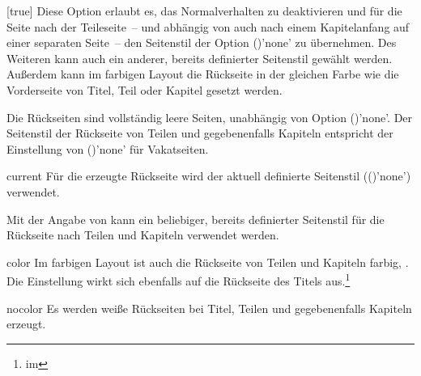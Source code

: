 \begin{Declaration*}{}
\begin{Declaration*}{}
\begin{Declaration*}{}
\begin{Declaration}{}[true]
Diese Option erlaubt es, das Normalverhalten zu deaktivieren und für die Seite 
nach der Teileseite~-- und abhängig von  auch nach einem 
Kapitelanfang auf einer separaten Seite~-- den Seitenstil der Option 
()'none' zu übernehmen. Des 
Weiteren kann auch ein anderer, bereits definierter Seitenstil gewählt werden. 
Außerdem kann im farbigen Layout die Rückseite in der gleichen Farbe wie die 
Vorderseite von Titel, Teil oder Kapitel gesetzt werden. 
\notudscrartcl
%
\begin{values}{}
\itemfalse
  Die Rückseiten sind vollständig leere Seiten, unabhängig von Option
  ()'none'.
\itemtrue*
  Der Seitenstil der Rückseite von Teilen und gegebenenfalls Kapiteln entspricht
  der Einstellung von ()'none' für 
  Vakatseiten.
\item[current]
  Für die erzeugte Rückseite wird der aktuell definierte Seitenstil 
  (()'none') verwendet.
\item[\PValueName{Seitenstil}]
  Mit der Angabe von  
  kann ein beliebiger, bereits definierter Seitenstil für die Rückseite nach 
  Teilen und Kapiteln verwendet werden.
\item[color]
  Im farbigen Layout ist auch die Rückseite von Teilen und Kapiteln farbig,  
  . Die Einstellung wirkt sich ebenfalls auf die Rückseite 
  des Titels aus.\footnote{%
     im \scrguide*%
  }%
\item[nocolor]
  Es werden weiße Rückseiten bei Titel, Teilen und gegebenenfalls Kapiteln 
  erzeugt.
\end{values}
%
\end{Declaration}




\end{Declaration*}
\end{Declaration*}
\end{Declaration*}
